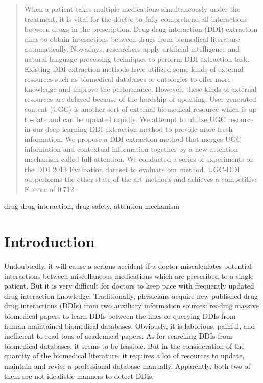 \documentclass[conference]{IEEEtran}
\begin{document}
\maketitle

\begin{abstract}
When a patient takes multiple medications simultaneously under the treatment, it is vital for the doctor to fully comprehend all interactions between drugs in the prescription.
Drug drug interaction (DDI) extraction aims to obtain interactions between drugs from biomedical literature automatically.
Nowadays, researchers apply artificial intelligence and natural language processing techniques to perform DDI extraction task.
Existing DDI extraction methods have utilized some kinds of external resources such as biomedical databases or ontologies to offer more knowledge and improve the performance.
However, these kinds of external resources are delayed because of the hardship of updating.
User generated content (UGC) is another sort of external biomedical resource which is up-to-date and can be updated rapidly.
We attempt to utilize UGC resource in our deep learning DDI extraction method to provide more fresh information.
We propose a DDI extraction method that merges UGC information and contextual information together by a new attention mechanism called full-attention.
We conducted a series of experiments on the DDI 2013 Evaluation dataset to evaluate our method.
UGC-DDI outperforms the other state-of-the-art methods and achieves a competitive F-score of 0.712.
\end{abstract}

\begin{IEEEkeywords}
drug drug interaction, drug safety, attention mechanism
\end{IEEEkeywords}

\section{Introduction}
Undoubtedly, it will cause a serious accident if a doctor miscalculates 
potential interactions
between miscellaneous medications which are prescribed to a single patient.
But it is very difficult for doctors to keep pace with frequently updated 
drug interaction knowledge.
Traditionally, physicians acquire new published drug drug interactions (DDIs) 
from two auxiliary information sources:
reading massive biomedical papers to learn DDIs between the lines
or querying DDIs from human-maintained biomedical databases.
Obviously, it is laborious, painful,
and inefficient to read tons of academical papers.
As for searching DDIs from biomedical databases, it seems to be feasible.
But in the consideration of the quantity of the biomedical literature,
it requires a lot of resources to update, maintain and revise a professional database manually.
Apparently, both two of them are not idealistic manners to detect DDIs.
\end{document}
